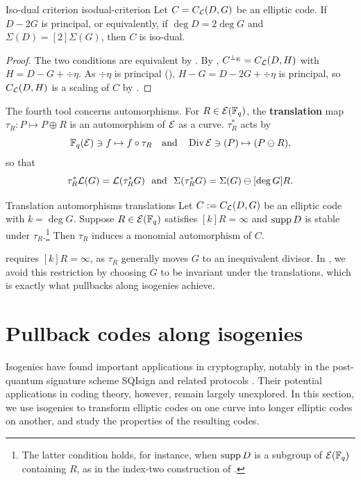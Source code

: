 \documentclass[twocolumn, 11pt]{scrartcl}
\begin{document}
\begin{lemma}{Iso-dual criterion \cite{zhu2026isodual}}{isodual-criterion}
    Let $C=C_\mathcal{L}(D,G)$ be an elliptic code. If $D-2G$ is principal, or equivalently, if $\deg D=2\deg G$ and $\Sigma(D)=[2]\Sigma(G)$, then $C$ is iso-dual.
\end{lemma}

\begin{proof}
    The two conditions are equivalent by . By , $C^{\perp_\mathrm{E}}=C_\mathcal{L}(D,H)$ with $H=D-G+\div\eta$. As $\div\eta$ is principal (), $H-G=D-2G+\div\eta$ is principal, so $C_\mathcal{L}(D,H)$ is a scaling of $C$ by .
\end{proof}

The fourth tool concerns automorphisms. For $R\in\mathcal{E}(\mathbb{F}_q)$, the \textbf{translation} map $\tau_R:P\mapsto P\oplus R$ is an automorphism of $\mathcal{E}$ as a curve. $\tau_R^*$ acts by
\[ \mathbb{F}_q(\mathcal{E})\ni f\mapsto f\circ\tau_R \quad\text{and}\quad \operatorname{Div}\mathcal{E}\ni(P)\mapsto(P\ominus R),\]
so that
\[ \tau_R^*\mcL(G)=\mcL(\tau_R^*G)\ \ \text{and}\ \ \Sigma(\tau_R^*G)=\Sigma(G)\ominus[\deg G]R.\]

\begin{theorem}{Translation automorphisms \cite{ma2023automorphism}}{translations}
    Let $C:=C_\mathcal{L}(D,G)$ be an elliptic code with $k=\deg G$. Suppose $R\in\mathcal{E}(\mathbb{F}_q)$ satisfies $[k]R=\infty$ and $\operatorname{supp} D$ is stable under $\tau_R$.\footnote{The latter condition holds, for instance, when $\operatorname{supp} D$ is a subgroup of $\mathcal{E}(\mathbb{F}_q)$ containing $R$, as in the index-two construction of \cite{wang2025nonrs}.} Then $\tau_R$ induces a monomial automorphism of $C$.
\end{theorem}

 requires $[k]R=\infty$, as $\tau_R$ generally moves $G$ to an inequivalent divisor. In , we avoid this restriction by choosing $G$ to be invariant under the translations, which is exactly what pullbacks along isogenies achieve.

\section{Pullback codes along isogenies} \label{section:isogenies}

Isogenies have found important applications in cryptography, notably in the post-quantum signature scheme SQIsign \cite{NISTPQC-ADD-R3:SQIsign26} and related protocols \cite{basso2026prism,jamielow2027}. Their potential applications in coding theory, however, remain largely unexplored. In this section, we use isogenies to transform elliptic codes on one curve into longer elliptic codes on another, and study the properties of the resulting codes.
\end{document}
